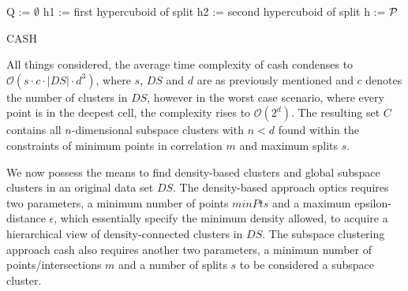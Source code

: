 \vspace{5mm}
\begin{algorithm}[H]
\SetAlgoLined
{}
Q := $\emptyset$\;     
h1 := first hypercuboid of split\;
h2 := second hypercuboid of split\;
h := $\mathcal{P}$

 \caption{CASH}
\end{algorithm}
\vspace{5mm}

All things considered, the average time complexity of \gls{cash} condenses to $\mathcal{O}(s \cdot c \cdot |DS| \cdot d^3)$, where $s$, $DS$ and $d$ are as previously mentioned and $c$ denotes the number of clusters in $DS$, however in the worst case scenario, where every point is in the deepest cell, the complexity rises to $\mathcal{O}(2^d)$. The resulting set $C$ contains all $n$-dimensional subspace clusters with $n < d$ found within the constraints of minimum points in correlation $m$ and maximum splits $s$.\\

We now possess the means to find density-based clusters and global subspace clusters in an original data set $DS$. The density-based approach \gls{optics} requires two parameters, a minimum number of points $minPts$ and a maximum epsilon-distance $\epsilon$, which essentially specify the minimum density allowed, to acquire a hierarchical view of density-connected clusters in $DS$. The subspace clustering approach \gls{cash} also requires another two parameters, a minimum number of points/intersections $m$ and a number of splits $s$ to be considered a subspace cluster.

